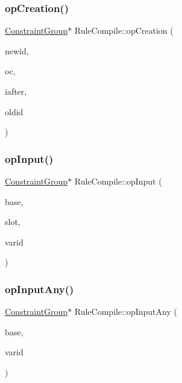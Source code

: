 \mbox{\label{class_rule_compile_aec1c991988bbafa96067c6109f27b0ef}} 
\subsubsection{\texorpdfstring{opCreation()}{opCreation()}}
{\footnotesize\ttfamily \mbox{\hyperlink{class_constraint_group}{Constraint\+Group}}$\ast$ Rule\+Compile\+::op\+Creation (\begin{DoxyParamCaption}\item[{int4}]{newid,  }\item[{\mbox{\hyperlink{opcodes_8hh_abeb7dfb0e9e2b3114e240a405d046ea7}{Op\+Code}}}]{oc,  }\item[{bool}]{iafter,  }\item[{int4}]{oldid }\end{DoxyParamCaption})}

\mbox{\label{class_rule_compile_a0700b701969b6c7a11ad4894468bb503}} 
\subsubsection{\texorpdfstring{opInput()}{opInput()}}
{\footnotesize\ttfamily \mbox{\hyperlink{class_constraint_group}{Constraint\+Group}}$\ast$ Rule\+Compile\+::op\+Input (\begin{DoxyParamCaption}\item[{\mbox{\hyperlink{class_constraint_group}{Constraint\+Group}} $\ast$}]{base,  }\item[{int8 $\ast$}]{slot,  }\item[{int4}]{varid }\end{DoxyParamCaption})}

\mbox{\label{class_rule_compile_a13d09bbd5d5ac72fa2b6b05068f6d101}} 
\subsubsection{\texorpdfstring{opInputAny()}{opInputAny()}}
{\footnotesize\ttfamily \mbox{\hyperlink{class_constraint_group}{Constraint\+Group}}$\ast$ Rule\+Compile\+::op\+Input\+Any (\begin{DoxyParamCaption}\item[{\mbox{\hyperlink{class_constraint_group}{Constraint\+Group}} $\ast$}]{base,  }\item[{int4}]{varid }\end{DoxyParamCaption})}

